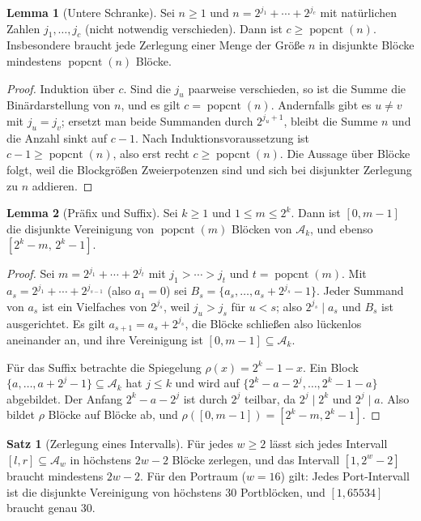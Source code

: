 \documentclass[a4paper,12pt, twoside]{report}
\theoremstyle{definition}
\newtheorem{satz}{Satz}
\newtheorem{lemma}{Lemma}
\DeclareMathOperator{\popcnt}{popcnt}
\begin{document}
\begin{lemma}[Untere Schranke]
\label{lem:mindest}
	Sei $n\ge 1$ und $n = 2^{j_1}+\cdots+2^{j_c}$ mit natürlichen Zahlen $j_1,\ldots,j_c$ (nicht notwendig verschieden). Dann ist $c\ge\popcnt(n)$. Insbesondere braucht jede Zerlegung einer Menge der Größe $n$ in disjunkte Blöcke mindestens $\popcnt(n)$ Blöcke.
\end{lemma}

\begin{proof}
	Induktion über $c$. Sind die $j_u$ paarweise verschieden, so ist die Summe die Binärdarstellung von $n$, und es gilt $c=\popcnt(n)$. Andernfalls gibt es $u\neq v$ mit $j_u=j_v$; ersetzt man beide Summanden durch $2^{j_u+1}$, bleibt die Summe $n$ und die Anzahl sinkt auf $c-1$. Nach Induktionsvoraussetzung ist $c-1\ge\popcnt(n)$, also erst recht $c \ge \popcnt(n)$. Die Aussage über Blöcke folgt, weil die Blockgrößen Zweierpotenzen sind und sich bei disjunkter Zerlegung zu $n$ addieren.
\end{proof}

\begin{lemma}[Präfix und Suffix]
\label{lem:praefix}
	Sei $k\ge 1$ und $1\le m\le 2^k$. Dann ist $[0,m-1]$ die disjunkte Vereinigung von $\popcnt(m)$ Blöcken von $\mathcal{A}_k$, und ebenso $[2^k-m,\,2^k-1]$.
\end{lemma}

\begin{proof}
	Sei $m = 2^{j_1}+\cdots+2^{j_t}$ mit $j_1>\cdots>j_t$ und $t=\popcnt(m)$. Mit $a_s = 2^{j_1}+\cdots+2^{j_{s-1}}$ (also $a_1=0$) sei $B_s=\{a_s,\ldots,a_s+2^{j_s}-1\}$. Jeder Summand von $a_s$ ist ein Vielfaches von $2^{j_s}$, weil $j_u>j_s$ für $u<s$; also $2^{j_s}\mid a_s$ und $B_s$ ist ausgerichtet. Es gilt $a_{s+1}=a_s+2^{j_s}$, die Blöcke schließen also lückenlos aneinander an, und ihre Vereinigung ist $[0,m-1]\subseteq\mathcal{A}_k$.

	Für das Suffix betrachte die Spiegelung $\rho(x)=2^k-1-x$. Ein Block $\{a,\ldots,a+2^j-1\}\subseteq\mathcal{A}_k$ hat $j\le k$ und wird auf $\{2^k-a-2^j,\ldots,2^k-1-a\}$ abgebildet. Der Anfang $2^k-a-2^j$ ist durch $2^j$ teilbar, da $2^j\mid 2^k$ und $2^j\mid a$. Also bildet $\rho$ Blöcke auf Blöcke ab, und $\rho([0,m-1]) = [2^k-m,2^k-1]$.
\end{proof}

\begin{satz}[Zerlegung eines Intervalls]
\label{satz:bereich}
	Für jedes $w\ge2$ lässt sich jedes Intervall $[l,r]\subseteq\mathcal{A}_w$ in höchstens $2w-2$ Blöcke zerlegen, und das Intervall $[1,2^w-2]$ braucht mindestens $2w-2$. Für den Portraum ($w=16$) gilt: Jedes Port-Intervall ist die disjunkte Vereinigung von höchstens $30$ Portblöcken, und $[1,65534]$ braucht genau $30$.
\end{satz}
\end{document}
